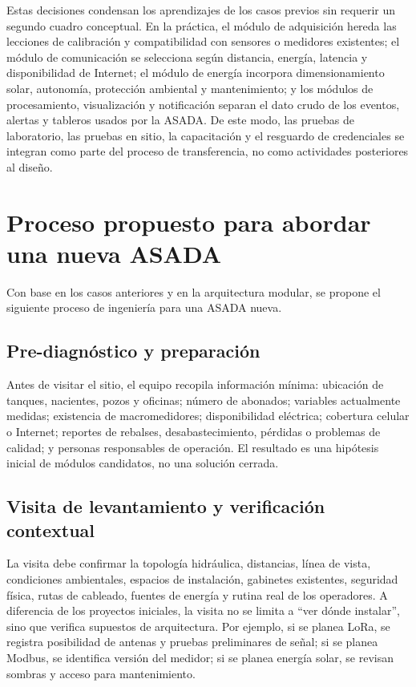 \documentclass[conference]{IEEEtran}
\begin{document}
Estas decisiones condensan los aprendizajes de los casos previos sin requerir un segundo cuadro conceptual. En la práctica, el módulo de adquisición hereda las lecciones de calibración y compatibilidad con sensores o medidores existentes; el módulo de comunicación se selecciona según distancia, energía, latencia y disponibilidad de Internet; el módulo de energía incorpora dimensionamiento solar, autonomía, protección ambiental y mantenimiento; y los módulos de procesamiento, visualización y notificación separan el dato crudo de los eventos, alertas y tableros usados por la ASADA. De este modo, las pruebas de laboratorio, las pruebas en sitio, la capacitación y el resguardo de credenciales se integran como parte del proceso de transferencia, no como actividades posteriores al diseño.

\section{Proceso propuesto para abordar una nueva ASADA}
Con base en los casos anteriores y en la arquitectura modular, se propone el siguiente proceso de ingeniería para una ASADA nueva.

\subsection{Pre-diagnóstico y preparación}
Antes de visitar el sitio, el equipo recopila información mínima: ubicación de tanques, nacientes, pozos y oficinas; número de abonados; variables actualmente medidas; existencia de macromedidores; disponibilidad eléctrica; cobertura celular o Internet; reportes de rebalses, desabastecimiento, pérdidas o problemas de calidad; y personas responsables de operación. El resultado es una hipótesis inicial de módulos candidatos, no una solución cerrada.

\subsection{Visita de levantamiento y verificación contextual}
La visita debe confirmar la topología hidráulica, distancias, línea de vista, condiciones ambientales, espacios de instalación, gabinetes existentes, seguridad física, rutas de cableado, fuentes de energía y rutina real de los operadores. A diferencia de los proyectos iniciales, la visita no se limita a ``ver dónde instalar'', sino que verifica supuestos de arquitectura. Por ejemplo, si se planea LoRa, se registra posibilidad de antenas y pruebas preliminares de señal; si se planea Modbus, se identifica versión del medidor; si se planea energía solar, se revisan sombras y acceso para mantenimiento.
\end{document}
